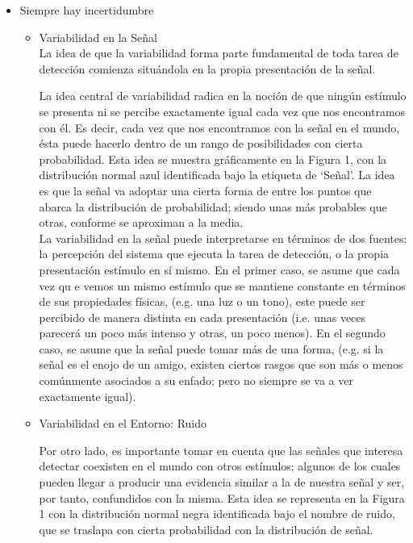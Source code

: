\begin{itemize}
  \item{Siempre hay incertidumbre}


    \begin{itemize}
      \item{Variabilidad en la Señal}\\

%

La idea de que la variabilidad forma parte fundamental de toda tarea de detección comienza situándola en la propia presentación de la señal. 

La idea central de variabilidad radica en la noción de que ningún estímulo se presenta ni se percibe exactamente igual cada vez que nos encontramos con él.  Es decir, cada vez que nos encontramos con la  señal en el mundo, ésta puede hacerlo dentro de un rango de posibilidades con cierta probabilidad. Esta idea se muestra gráficamente en la Figura 1, con la distribución normal azul identificada bajo la etiqueta de ‘Señal’. La idea es que la señal va adoptar una cierta forma de entre los puntos que abarca la distribución de probabilidad; siendo unas más probables que otras, conforme se aproximan a la media.\\

La variabilidad en la señal puede interpretarse en términos de dos fuentes: la percepción del sistema que ejecuta la tarea de detección, o la propia presentación estímulo en sí mismo. En el primer caso, se asume que cada vez qu e vemos un mismo estímulo que se mantiene constante en términos de sus propiedades físicas,  (e.g. una luz o un tono),  este puede ser percibido de manera distinta en cada presentación (i.e. unas veces parecerá un poco más intenso y otras, un poco menos). En el segundo caso, se asume que la señal puede tomar más de una forma, (e.g. si la señal es el enojo de un amigo, existen ciertos rasgos que son más o menos comúnmente asociados a su enfado; pero no siempre se va a ver exactamente igual).\\

      \item{Variabilidad en el Entorno: Ruido}

Por otro lado, es importante tomar en cuenta que las señales que interesa detectar coexisten en el mundo con otros estímulos; algunos de los cuales pueden llegar a producir una evidencia similar a la de nuestra señal y ser, por tanto, confundidos con la misma. Esta idea se representa en la Figura 1 con la distribución normal negra identificada bajo el nombre de ruido, que se traslapa con cierta probabilidad con la distribución de señal.\\



\end{itemize}
\end{itemize}
